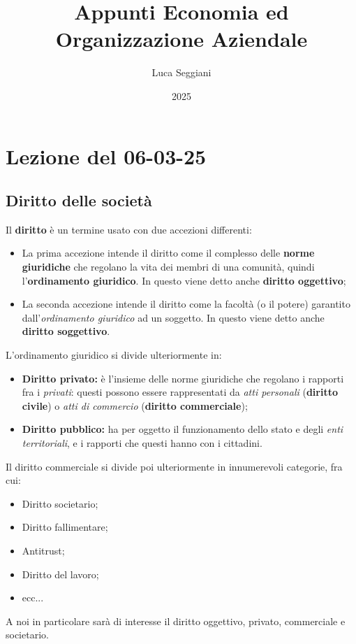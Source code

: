 \documentclass[a4paper,11pt]{article}
\title{Appunti Economia ed Organizzazione Aziendale}
\author{Luca Seggiani}
\date{2025}
\begin{document}
\section{Lezione del 06-03-25}

\thispagestyle{empty}
\pagestyle{fancy}

\subsection{Diritto delle società}
Il \textbf{diritto} è un termine usato con due accezioni differenti:
\begin{itemize}
	\item La prima accezione intende il diritto come il complesso delle \textbf{norme giuridiche} che regolano la vita dei membri di una comunità, quindi l'\textbf{ordinamento giuridico}. In questo viene detto anche \textbf{diritto oggettivo};
	\item La seconda accezione intende il diritto come la facoltà (o il potere) garantito dall'\textit{ordinamento giuridico} ad un soggetto. In questo viene detto anche \textbf{diritto soggettivo}.
\end{itemize}

L'ordinamento giuridico si divide ulteriormente in:
\begin{itemize}
	\item \textbf{Diritto privato:} è l'insieme delle norme giuridiche che regolano i rapporti fra i \textit{privati}: questi possono essere rappresentati da \textit{atti personali} (\textbf{diritto civile}) o \textit{atti di commercio} (\textbf{diritto commerciale});
	\item \textbf{Diritto pubblico:} ha per oggetto il funzionamento dello stato e degli \textit{enti territoriali}, e i rapporti che questi hanno con i cittadini.
\end{itemize}

Il diritto commerciale si divide poi ulteriormente in innumerevoli categorie, fra cui:
\begin{itemize}
	\item Diritto societario;
	\item Diritto fallimentare;
	\item Antitrust;
	\item Diritto del lavoro;
	\item ecc...
\end{itemize}

A noi in particolare sarà di interesse il diritto oggettivo, privato,  commerciale e societario.
\end{document}
